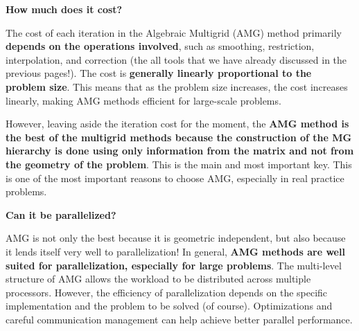 \highspace
\begin{flushleft}
	\textcolor{Red2}{ \textbf{How much does it cost?}}
\end{flushleft}
The cost of each iteration in the Algebraic Multigrid (AMG) method primarily \textbf{depends on the operations involved}, such as smoothing, restriction, interpolation, and correction (the all tools that we have already discussed in the previous pages!). The cost is \textbf{generally linearly proportional to the problem size}. This means that as the problem size increases, the cost increases linearly, making AMG methods efficient for large-scale problems.

\highspace
However, leaving aside the iteration cost for the moment, the \textbf{AMG method is the best of the multigrid methods because the construction of the MG hierarchy is done using only information from the matrix and not from the geometry of the problem}. This is the main and most important key. This is one of the most important reasons to choose AMG, especially in real practice problems.

\highspace
\begin{flushleft}
	\textcolor{Green3}{ \textbf{Can it be parallelized?}}
\end{flushleft}
AMG is not only the best because it is geometric independent, but also because it lends itself very well to parallelization! In general, \textbf{AMG methods are well suited for parallelization, especially for large problems}. The multi-level structure of AMG allows the workload to be distributed across multiple processors. However, the efficiency of parallelization depends on the specific implementation and the problem to be solved (of course). Optimizations and careful communication management can help achieve better parallel performance.
